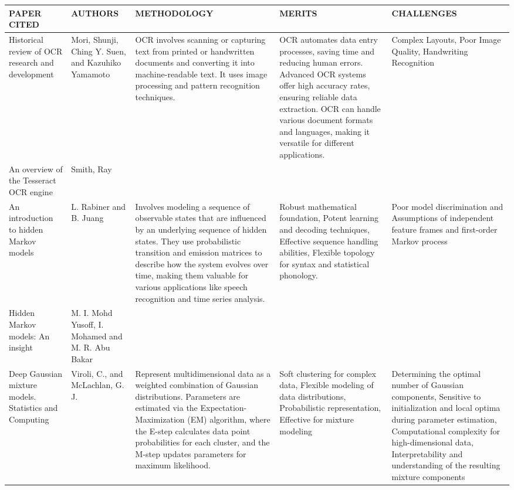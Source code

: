 \documentclass[conference]{IEEEtran}
\begin{document}
\begin{table}
\begin{center}
 \centering
    \begin{tabular}{ |p{2cm}|p{2cm}|p{4cm}|p{3cm}|p{4cm}| }
\hline
\centering PAPER CITED & \centering  AUTHORS & \centering METHODOLOGY &  \centering MERITS &  \centering CHALLENGES \arraybackslash \\ 
\hline
[5] Historical review of OCR research and development &  Mori, Shunji, Ching Y. Suen, and Kazuhiko Yamamoto &  OCR involves scanning or capturing text from printed or handwritten documents and converting it into machine-readable text. It uses image processing and pattern recognition techniques. &  OCR automates data entry processes, saving time and reducing human errors. Advanced OCR systems offer high accuracy rates, ensuring reliable data extraction. OCR can handle various document formats and languages, making it versatile for different applications. &  Complex Layouts, Poor Image Quality, Handwriting Recognition  \\
\hline
[6] An overview of the Tesseract OCR engine  &  Smith, Ray &  &  &    \\
\hline
[7] An introduction to hidden Markov models &  L. Rabiner and B. Juang &  Involves modeling a sequence of observable states that are influenced by an underlying sequence of hidden states. They use probabilistic transition and emission matrices to describe how the system evolves over time, making them valuable for various applications like speech recognition and time series analysis. & Robust mathematical foundation, Potent learning and decoding techniques, Effective sequence handling abilities, Flexible topology for syntax and statistical phonology. &  Poor model discrimination and Assumptions of independent feature frames and first-order Markov process  \\
\hline
[8] Hidden Markov models: An insight &  M. I. Mohd Yusoff, I. Mohamed and M. R. Abu Bakar & & &   \\
\hline
[9] Deep Gaussian mixture models. Statistics and Computing &  Viroli, C., and McLachlan, G. J. & Represent multidimensional data as a weighted combination of Gaussian distributions. Parameters are estimated via the Expectation-Maximization (EM) algorithm, where the E-step calculates data point probabilities for each cluster, and the M-step updates parameters for maximum likelihood. &  Soft clustering for complex data, Flexible modeling of data distributions, Probabilistic representation, Effective for mixture modeling &  Determining the optimal number of Gaussian components, Sensitive to initialization and local optima during parameter estimation, Computational complexity for high-dimensional data, Interpretability and understanding of the resulting mixture components \\

\end{tabular}
\end{center}
\end{table}
\end{document}
